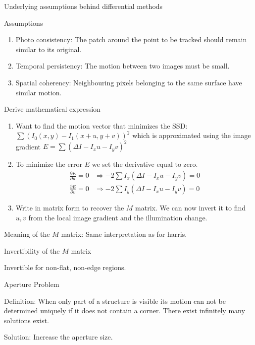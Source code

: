 \documentclass[10pt,a4paper]{scrartcl}
\begin{document}
\begin{multicols*}{2}
\begin{QandA}
{Underlying assumptions behind differential methods}
\item Assumptions
\begin{enumerate}
\item Photo consistency: The patch around the point to be tracked should remain similar to its original.
\item Temporal persistency: The motion between two images must be small.
\item Spatial coherency: Neighbouring pixels belonging to the same surface have similar motion.
\end{enumerate}
\item Derive mathematical expression
\begin{enumerate}
\item Want to find the motion vector that minimizes the SSD: $\sum(I_0(x,y)-I_1(x+u,y+v))^2$ which is approximated using the image gradient $E = \sum(\Delta I-I_x u-I_y v)^2$
\item To minimize the error $E$ we set the derivative equal to zero.
\begin{align*}
\frac{\partial E}{\partial u}=0&\Rightarrow-2\sum I_x(\Delta I-I_xu-I_yv) = 0\\
\frac{\partial E}{\partial v}=0&\Rightarrow-2\sum I_y(\Delta I -I_xu-I_yv)=0
\end{align*}
\item Write in matrix form to recover the $M$ matrix. We can now invert it to find $u,v$ from the local image gradient and the illumination change.
\end{enumerate}
\item Meaning of the $M$ matrix: Same interpretation as for harris.
\end{QandA}

\begin{QandA}
{Invertibility of the $M$ matrix}
\item Invertible for non-flat, non-edge regions.
\end{QandA}

\begin{QandA}
{Aperture Problem}
\item Definition: When only part of a structure is visible its motion can not be determined uniquely if it does not contain a corner. There exist infinitely many solutions exist.
\item Solution: Increase the aperture size.
\end{QandA}


\end{multicols*}
\end{document}

